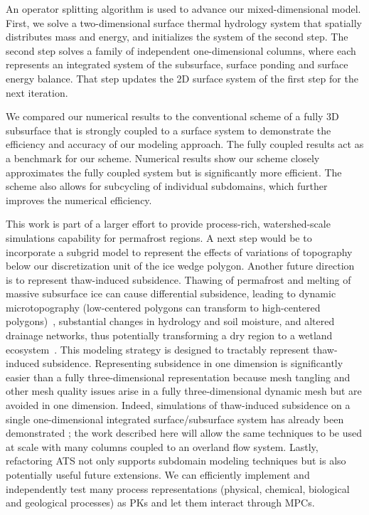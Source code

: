\documentclass[review]{elsarticle}
\begin{document}
An operator splitting algorithm is used to advance our mixed-dimensional model. First, we solve a two-dimensional surface thermal hydrology system that spatially distributes mass and energy, and initializes the system of the second step. The second step solves a family of independent one-dimensional columns, where each represents an integrated system of the subsurface, surface ponding and surface energy balance. That step updates the 2D surface system of the first step for the next iteration.

We compared our numerical results to the conventional scheme of a fully 3D subsurface that is strongly coupled to a surface system to demonstrate the efficiency and accuracy of our modeling approach. The fully coupled results act as a benchmark for our scheme. Numerical results show our scheme closely approximates the fully coupled system but is significantly more efficient. The scheme also allows for subcycling of individual subdomains, which further improves the numerical efficiency. 

This work is part of a larger effort to provide process-rich, watershed-scale simulations capability for permafrost regions.  A next step would be to incorporate a subgrid model to represent the effects of  variations of topography below our discretization unit of the ice wedge polygon. Another future direction is to represent thaw-induced subsidence. Thawing of permafrost and melting of massive subsurface ice can cause differential subsidence, leading to dynamic microtopography (low-centered polygons can transform to high-centered polygons)~\cite{jorgenson2006abrupt,liljedahl2012ice}, substantial changes in hydrology and soil moisture, and altered drainage networks, thus potentially transforming a dry region to a wetland ecosystem~\cite{hinzman2005evidence,rowland2010arctic}. This modeling strategy is designed to tractably represent  thaw-induced subsidence. Representing subsidence in one dimension is significantly easier than a fully three-dimensional representation because mesh tangling and other mesh quality issues arise in a fully three-dimensional dynamic mesh but are avoided in one dimension. Indeed, simulations of thaw-induced subsidence on a single one-dimensional integrated surface/subsurface system has already been demonstrated \cite{painter2013modeling}; the work described here will allow the same techniques to be used at scale with many columns coupled to an overland flow system. Lastly, refactoring ATS not only supports subdomain modeling techniques but is also potentially useful future extensions. We can efficiently implement and independently test many process representations (physical, chemical, biological and geological processes) as PKs and let them interact through MPCs. 
 
\end{document}
